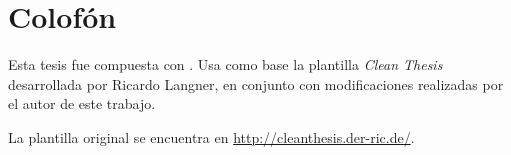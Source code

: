 %
\pagestyle{empty}
\hfill
\vfill
{}
\section*{Colofón}

Esta tesis fue compuesta con \LaTeXe.
Usa como base la plantilla \textit{Clean Thesis} desarrollada por Ricardo Langner, en conjunto con modificaciones realizadas por el autor de este trabajo.

La plantilla original se encuentra en \url{http://cleanthesis.der-ric.de/}.
